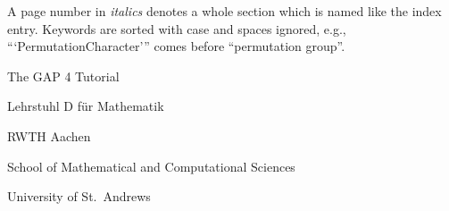 
\def\exercise{\begingroup\def\par{\endgraf\endgroup\medskip\noindent}
  \medskip\noindent{\bf Exercise:}\quad}

\FrontMatter
%
%

\Chapters



\Appendices

\Bibliography

A page number in {\it italics} denotes a whole  section which is named
like   the index entry.  Keywords  are   sorted  with case and  spaces
ignored,  e.g., ```PermutationCharacter''' comes before  ``permutation
group''.

\Index

\undoquotes
\null\vfill
\centerline{\titlefont The GAP 4 Tutorial}
\bigskip
\centerline{\secfont Lehrstuhl D f\"ur Mathematik}
\smallskip
\centerline{\secfont RWTH Aachen}
\bigskip
\centerline{\secfont School of Mathematical and Computational
Sciences}
\smallskip
\centerline{\secfont University of St.~Andrews}
  
\TableOfContents

\bye

